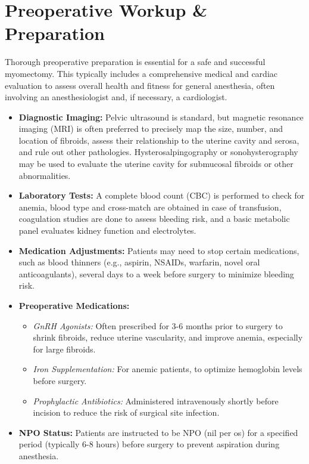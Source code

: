 \section*{Preoperative Workup \& Preparation}
Thorough preoperative preparation is essential for a safe and successful myomectomy. This typically includes a comprehensive medical and cardiac evaluation to assess overall health and fitness for general anesthesia, often involving an anesthesiologist and, if necessary, a cardiologist.

\begin{itemize}
  \item \textbf{Diagnostic Imaging:} Pelvic ultrasound is standard, but magnetic resonance imaging (MRI) is often preferred to precisely map the size, number, and location of fibroids, assess their relationship to the uterine cavity and serosa, and rule out other pathologies. Hysterosalpingography or sonohysterography may be used to evaluate the uterine cavity for submucosal fibroids or other abnormalities.
  
  \item \textbf{Laboratory Tests:} A complete blood count (CBC) is performed to check for anemia, blood type and cross-match are obtained in case of transfusion, coagulation studies are done to assess bleeding risk, and a basic metabolic panel evaluates kidney function and electrolytes.
  
  \item \textbf{Medication Adjustments:} Patients may need to stop certain medications, such as blood thinners (e.g., aspirin, NSAIDs, warfarin, novel oral anticoagulants), several days to a week before surgery to minimize bleeding risk.
  
  \item \textbf{Preoperative Medications:}
    \begin{itemize}
      \item \textit{GnRH Agonists:} Often prescribed for 3-6 months prior to surgery to shrink fibroids, reduce uterine vascularity, and improve anemia, especially for large fibroids.
      \item \textit{Iron Supplementation:} For anemic patients, to optimize hemoglobin levels before surgery.
      \item \textit{Prophylactic Antibiotics:} Administered intravenously shortly before incision to reduce the risk of surgical site infection.
    \end{itemize}
  
  \item \textbf{NPO Status:} Patients are instructed to be NPO (nil per os) for a specified period (typically 6-8 hours) before surgery to prevent aspiration during anesthesia.
  

\end{itemize}
